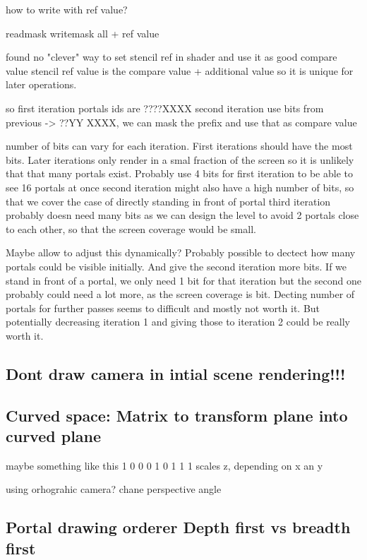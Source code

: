 how to write with ref value?

readmask
writemask all + ref value

found no "clever" way to set stencil ref in shader and use it as good compare value
stencil ref value is the compare value + additional value so it is unique for later operations.

so first iteration portals ids are ????XXXX
second iteration use bits from previous -> ??YY XXXX, we can mask the prefix and use that as compare value

number of bits can vary for each iteration. First iterations should have the most bits. Later iterations only render in a smal fraction of the screen so it is unlikely that that many portals exist.
Probably use 4 bits for first iteration to be able to see 16 portals at once
second iteration might also have a high number of bits, so that we cover the case of directly standing in front of portal
third iteration probably doesn need many bits as we can design the level to avoid 2 portals close to each other, so that the screen coverage would be small.

Maybe allow to adjust this dynamically? Probably possible to dectect how many portals could be visible initially. And give the second iteration more bits. If we stand in front of a portal, we only need 1 bit for that iteration but the second one probably could need a lot more, as the screen coverage is bit.
Decting number of portals for further passes seems to difficult and mostly not worth it. But potentially decreasing iteration 1 and giving those to iteration 2 could be really worth it.



\subsection{Dont draw camera in intial scene rendering!!!}

\subsection{ Curved space: Matrix to transform plane into curved plane}
maybe something like this
1 0 0
0 1 0
1 1 1
scales z, depending on x an y

using orhograhic camera?
chane perspective angle

\subsection{Portal drawing orderer Depth first vs breadth first}




